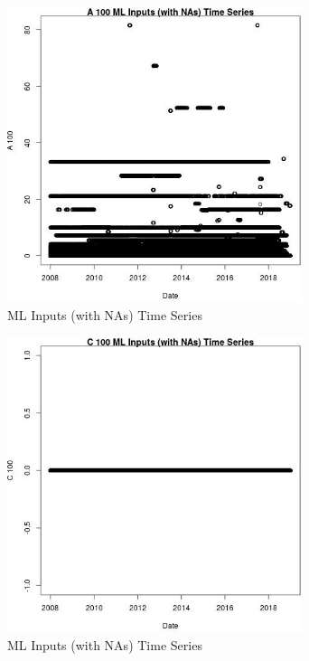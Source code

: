 \begin{figure} 
\centering  
\includegraphics[width=0.77\textwidth]{Code_Outputs/Report_ML_input_PM25_Step4_part_e_de_duplicated_aves_compiled_2019-05-21wNAs_A_100vDate.jpg} 
\caption{\label{fig:Report_ML_input_PM25_Step4_part_e_de_duplicated_aves_compiled_2019-05-21wNAsA_100vDate}ML Inputs (with NAs) Time Series} 
\end{figure} 
 

\begin{figure} 
\centering  
\includegraphics[width=0.77\textwidth]{Code_Outputs/Report_ML_input_PM25_Step4_part_e_de_duplicated_aves_compiled_2019-05-21wNAs_C_100vDate.jpg} 
\caption{\label{fig:Report_ML_input_PM25_Step4_part_e_de_duplicated_aves_compiled_2019-05-21wNAsC_100vDate}ML Inputs (with NAs) Time Series} 
\end{figure} 
 

